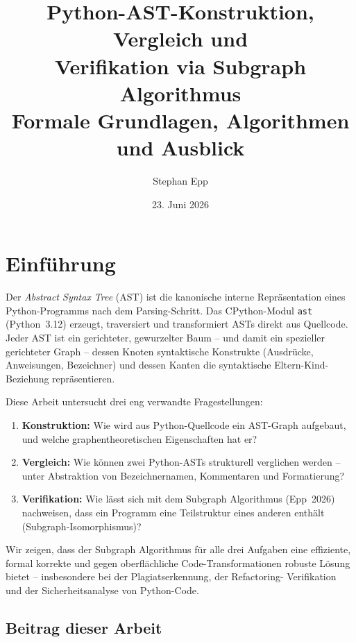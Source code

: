 ﻿\documentclass[a4paper,12pt]{article}
\title{\textbf{Python-AST-Konstruktion, Vergleich und\\
Verifikation via Subgraph Algorithmus}\\[0.1em]
\large Formale Grundlagen, Algorithmen und Ausblick}
\author{Stephan Epp}
\date{23. Juni 2026}
\theoremstyle{definition}
\begin{document}
\maketitle
\tableofcontents
\newpage

\section{Einf\"uhrung}

Der \emph{Abstract Syntax Tree} (AST) ist die kanonische interne
Repr\"asentation eines Python-Programms nach dem Parsing-Schritt.
Das CPython-Modul \texttt{ast} (Python~3.12) erzeugt, traversiert
und transformiert ASTs direkt aus Quellcode.  Jeder AST ist ein
gerichteter, gewurzelter Baum -- und damit ein spezieller gerichteter
Graph -- dessen Knoten syntaktische Konstrukte (Ausdr\"ucke,
Anweisungen, Bezeichner) und dessen Kanten die syntaktische
Eltern-Kind-Beziehung repr\"asentieren.

Diese Arbeit untersucht drei eng verwandte Fragestellungen:
\begin{enumerate}
    \item \textbf{Konstruktion:} Wie wird aus Python-Quellcode ein
          AST-Graph aufgebaut, und welche graphentheoretischen
          Eigenschaften hat er?
    \item \textbf{Vergleich:} Wie k\"onnen zwei Python-ASTs strukturell
          verglichen werden -- unter Abstraktion von Bezeichnernamen,
          Kommentaren und Formatierung?
    \item \textbf{Verifikation:} Wie l\"asst sich mit dem Subgraph
          Algorithmus (Epp~2026) \cite{epp2026} nachweisen, dass ein
          Programm eine Teilstruktur eines anderen enth\"alt
          (Subgraph-Isomorphismus)?
\end{enumerate}

Wir zeigen, dass der Subgraph Algorithmus f\"ur alle drei
Aufgaben eine effiziente, formal korrekte und gegen
oberfl\"achliche Code-Transformationen robuste L\"osung bietet
-- insbesondere bei der Plagiats\-erkennung, der Refactoring-
Verifikation und der Sicherheitsanalyse von Python-Code.

\subsection{Beitrag dieser Arbeit}
\end{document}
